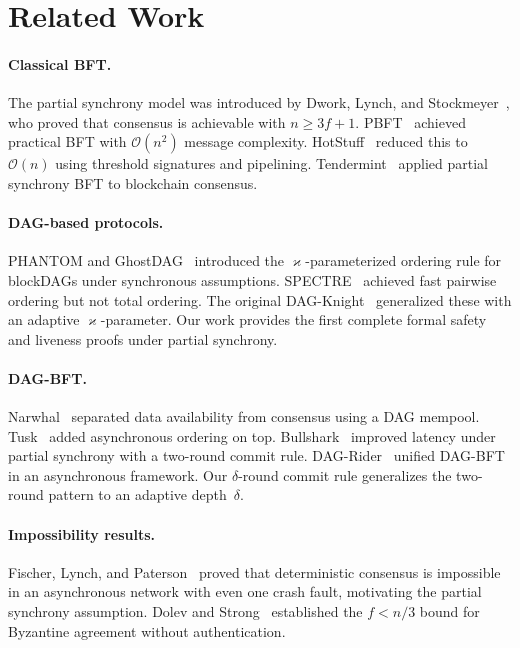 \documentclass[11pt,a4paper]{article}
\theoremstyle{definition}
\theoremstyle{remark}
\renewcommand{\kappa}{\varkappa}
\newcommand{\bigO}{\mathcal{O}}
\begin{document}
\section{Related Work}\label{sec:related}

\paragraph{Classical BFT.}
The partial synchrony model was introduced by Dwork, Lynch, and
Stockmeyer~\cite{dwork1988consensus}, who proved that consensus is
achievable with $n \geq 3f+1$.
PBFT~\cite{castro1999pbft} achieved practical BFT with $\bigO(n^2)$
message complexity.
HotStuff~\cite{yin2019hotstuff} reduced this to $\bigO(n)$ using
threshold signatures and pipelining.
Tendermint~\cite{buchman2016tendermint} applied partial synchrony BFT
to blockchain consensus.

\paragraph{DAG-based protocols.}
PHANTOM and GhostDAG~\cite{sompolinsky2021phantom} introduced the
$\kappa$-parameterized ordering rule for blockDAGs under synchronous
assumptions.
SPECTRE~\cite{sompolinsky2018spectre} achieved fast pairwise ordering
but not total ordering.
The original DAG-Knight~\cite{sompolinsky2022dagknight} generalized
these with an adaptive $\kappa$-parameter.
Our work provides the first complete formal safety and liveness proofs
under partial synchrony.

\paragraph{DAG-BFT.}
Narwhal~\cite{danezis2022narwhal} separated data availability from
consensus using a DAG mempool.
Tusk~\cite{danezis2022narwhal} added asynchronous ordering on top.
Bullshark~\cite{spiegelman2022bullshark} improved latency under
partial synchrony with a two-round commit rule.
DAG-Rider~\cite{keidar2021all} unified DAG-BFT in an asynchronous
framework.
Our $\delta$-round commit rule generalizes the two-round pattern to an
adaptive depth~$\delta$.

\paragraph{Impossibility results.}
Fischer, Lynch, and Paterson~\cite{fischer1985impossibility} proved
that deterministic consensus is impossible in an asynchronous network
with even one crash fault, motivating the partial synchrony assumption.
Dolev and Strong~\cite{dolev1983authenticated} established the $f < n/3$
bound for Byzantine agreement without authentication.
\end{document}
